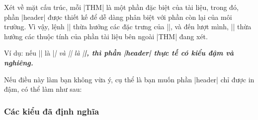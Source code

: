 Xét về mặt cấu trúc, mỗi |THM| là một phần đặc biệt
của tài liệu, trong đó, phần |header| được thiết kế để dễ dàng
phân biệt với phần còn lại của môi trường.
Vì vậy, lệnh |\theoremheaderfont| thừa hưởng các đặc trưng của |\theorembodyfont|,
và đến lượt mình, |\theorembodyfont| thừa hưởng các thuộc tính của phần
tài liệu bên ngoài |THM| đang xét.

\medskip
Ví dụ:
nếu |\theorembodyfont| là |\itshape| và |\theoremheaderfont| là |\bfseries|,
thì phần |header| thực tế có kiểu \textbf{\textit{đậm và nghiêng}}.

\medskip
Nếu điều này làm bạn không vừa ý, cụ thể là bạn muốn phần |header|
chỉ được in đậm, có thể làm như sau:
\begin{example}
  \theoremheaderfont{\normalfont\bfseries}
\end{example}


\subsubsection{Các kiểu đã định nghĩa}

\label{sec:predefdstyles}

